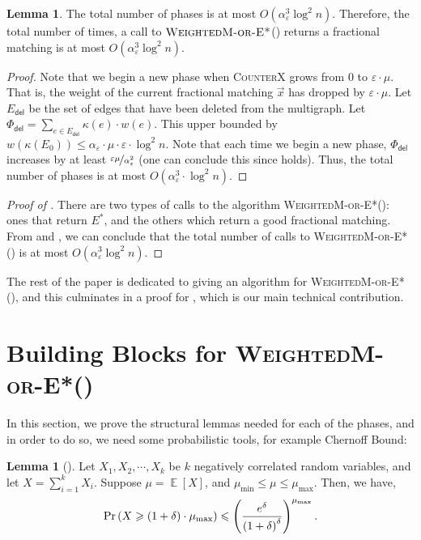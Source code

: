 \documentclass[a4paper,11pt]{article}
\DeclareMathOperator*{\Exp}{\ensuremath{{\mathbb{E}}}}
\DeclareMathOperator*{\Prob}{\ensuremath{\textnormal{Pr}}}
\renewcommand{\Pr}{\Prob}
\newcommand{\prob}[1]{\Pr\paren{#1}}
\newcommand{\paren}[1]{\left ( #1 \right )}
\newcommand{\bracket}[1]{\left [ #1 \right ]}
\newcommand{\expect}[1]{\Exp\bracket{#1}}
\newcommand{\eps}{\varepsilon}
\theoremstyle{definition}
\theoremstyle{definition}
\theoremstyle{definition}
\theoremstyle{definition}
\theoremstyle{definition}
\newtheorem{lemma2}[definition2]{Lemma}
\theoremstyle{definition}
\theoremstyle{definition}
\theoremstyle{definition}
\theoremstyle{definition}
\theoremstyle{definition}
\theoremstyle{definition}
\theoremstyle{definition}
\theoremstyle{definition}
\theoremstyle{definition}
\theoremstyle{definition}
\begin{document}
\begin{lemma2}\label{lem:calltype2}
The total number of phases is at most $O(\alpha_{\eps}^3\log ^2n)$. Therefore, the total number of times, a call to $\textsc{WeightedM-or-E*}$() returns a fractional matching is at most $O(\alpha_{\eps}^3\log ^2n)$.
\end{lemma2}
\begin{proof}
Note that we begin a new phase when \textsc{CounterX} grows from $0$ to $\eps\cdot\mu$. That is, the weight of the current fractional matching $\vec{x}$ has dropped by $\eps\cdot\mu$. Let $E_{\textsf{del}}$ be the set of edges that have been deleted from the multigraph. Let $\Phi_{\textsf{del}}=\sum_{e\in E_{\textsf{del}}} \kappa(e)\cdot w(e)$. This upper bounded by $w(\kappa(E_0))\leqslant \alpha_{\eps}\cdot \mu\cdot \eps\cdot \log^2 n$. Note that each time we begin a new phase, $\Phi_{\textsf{del}}$ increases by at least $\nicefrac{\eps\mu}{\alpha_{\eps}^2}$ (one can conclude this since  holds). Thus, the total number of phases is at most $O(\alpha_{\eps}^3\cdot \log ^2n)$.
\end{proof}

\begin{proof}[Proof of ]
There are two types of calls to the algorithm \textsc{WeightedM-or-E*}(): ones that return $E^*$, and the others which return a good fractional matching. From  and , we can conclude that the total number of calls to \textsc{WeightedM-or-E*}() is at most $O(\alpha_{\eps}^3\log^2 n)$.
\end{proof}

The rest of the paper is dedicated to giving an algorithm for \textsc{WeightedM-or-E*}(), and this culminates in a proof for , which is our main technical contribution.

\section{Building Blocks for \textsc{WeightedM-or-E*}()}

In this section, we prove the structural lemmas needed for each of the phases, and in order to do so, we need some probabilistic tools, for example Chernoff Bound:

\begin{lemma2}[\cite{DP09}]\label{lem:chernoff}
Let $X_1,X_2,\cdots,X_k$ be $k$ negatively correlated random variables, and let $X=\sum_{i=1}^k X_i$. Suppose $\mu=\expect{X}$, and $\mu_{\text{min}}\leqslant \mu \leqslant \mu_{\text{max}}$. Then, we have,
\begin{align*}
\prob{X\geqslant (1+\delta)\cdot \mu_{\text{max}}}\leqslant \paren{\frac{e^{\delta}}{\paren{1+\delta}^\delta}}^{\mu_{\text{max}}}.
\end{align*}
\end{lemma2}
\end{document}
